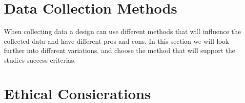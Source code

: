  \section{Data Collection Methods}

    When collecting data a design can use different methods that will influence the collected data and have different pros and cons. In this section we will look further into different variations, and choose the method that will support the studies success criterias. 


  \section{Ethical Consierations}





